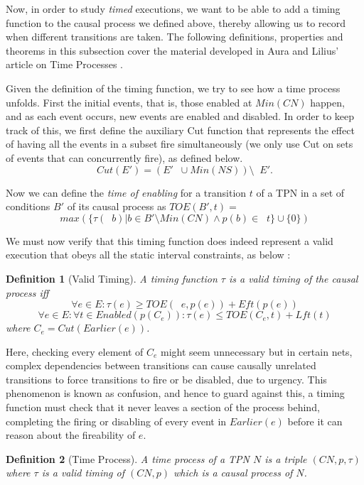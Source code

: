 \documentclass[conference]{IEEEtran}
\DeclareMathOperator*{\pre}{^\bullet}
\newtheorem{definition}{Definition}
\begin{document}
Now, in order to study \textit{timed} executions, we want to be able to add a timing function to the causal process we defined above, thereby allowing us to record when different transitions are taken. 
The following definitions, properties and theorems in this subsection cover the material developed in Aura and Lilius' article on Time Processes \cite{AL97}. 

Given the definition of the timing function, we try to see how a time process unfolds. 
First the initial events, that is, those enabled at $Min(CN)$ happen, and as each event occurs, new events are enabled and disabled. 
In order to keep track of this, we first define the auxiliary Cut function that represents the effect of having all the events in a subset fire simultaneously (we only use Cut on sets of events that can concurrently fire), as defined below. 
$$Cut(E') = (E' \pre  \cup Min(NS)) \setminus \pre  E'.$$

Now we can define the  \textit{time of enabling} for a transition $t$ of a TPN in a set of conditions $B'$ of its causal process as $TOE(B', t) = $ $$ max(\{\tau(\pre b) | b \in B' \setminus Min(CN) \wedge p(b) \in \pre  t\} \cup \{0\})$$

We must now verify that this timing function does indeed represent a valid execution that obeys all the static interval constraints, as below : 

\begin{definition}[Valid Timing] \label{validt} A timing function $\tau$ is a \textit{valid timing} of the causal process iff 
	$$\forall e \in E : \tau(e) \geq TOE(\pre e, p(e) ) + Eft(p(e))$$
	$$\forall e \in E : \forall t \in Enabled (p(C_e)) : \tau(e) \leq TOE(C_e, t) + Lft(t)$$ 
	where $C_e = Cut(Earlier(e))$. 
\end{definition}

Here, checking every element of $C_e$ might seem unnecessary but in certain nets, complex dependencies between transitions can cause causally unrelated transitions to force transitions to fire or be disabled, due to urgency. 
This phenomenon is known as confusion, and hence to guard against this, a timing function must check that it never leaves a section of the process behind, completing the firing or disabling of every event in $Earlier(e)$ before it can reason about the fireability of $e$. 

\begin{definition}[Time Process] \label{tp} A \textit{time process} of a TPN $N$ is a triple $(CN, p, \tau)$ where $\tau$ is a valid timing of $(CN, p)$ which is a causal process of $N$. 
\end{definition}
\end{document}
